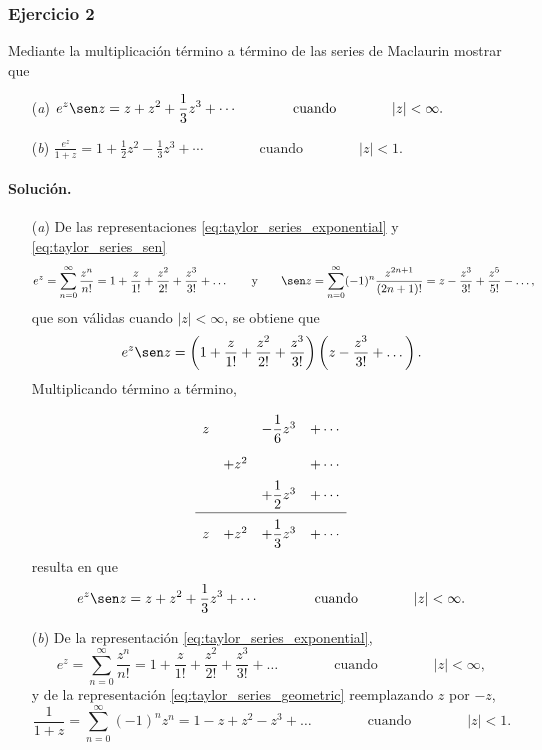 \documentclass[a4paper]{report}
\begin{document}
\subsubsection*{Ejercicio 2}

Mediante la multiplicación término a término de las series de Maclaurin mostrar que 
\begin{enumerate}
 \item[(\textit{a})] 
 \(
 \displaystyle e^z\sen z=z+z^2+\frac{1}{3}z^3+\cdots
 \qquad\qquad\textrm{cuando}\qquad\qquad
 |z|<\infty.
 \)
 \item[(\textit{b})] 
 \(
 \displaystyle\frac{e^z}{1+z}=1+\frac{1}{2}z^2-\frac{1}{3}z^3+\cdots
 \qquad\qquad\textrm{cuando}\qquad\qquad
 |z|<1.
 \) 
\end{enumerate}

\paragraph{Solución.} 
\begin{enumerate}
 \item[(\textit{a})] De las representaciones \ref{eq:taylor_series_exponential} y \ref{eq:taylor_series_sen}  
\[
 e^z=\sum_{n=0}^\infty\frac{z^n}{n!}=1+\frac{z}{1!}+\frac{z^2}{2!}+\frac{z^3}{3!}+\dots
 \qquad\textrm{y}\qquad 
 \sen z=\sum_{n=0}^\infty(-1)^n\frac{z^{2n+1}}{(2n+1)!}=z-\frac{z^3}{3!}+\frac{z^5}{5!}-\dots,
\]
que son válidas cuando \(|z|<\infty\), se obtiene que 
\[
 e^z\sen z=\left(1+\frac{z}{1!}+\frac{z^2}{2!}+\frac{z^3}{3!}\right)\left(z-\frac{z^3}{3!}+\dots\right).
\]
 Multiplicando término a término,
\[
\setlength\extrarowheight{10pt}
\begin{array}[t]{cccc}
 z &       & -\dfrac{1}{6}z^3 &+\cdots\\
   & +z^2  &                  &+\cdots\\
   &       &  +\dfrac{1}{2}z^3 &+\cdots\\[\medskipamount]   
\cline{1-4}
 z & +z^2  & +\dfrac{1}{3}z^3&+\cdots
\end{array}
\]
resulta en que 
\[
 e^z\sen z=z+z^2+\dfrac{1}{3}z^3+\cdots
 \qquad\qquad\textrm{cuando}\qquad\qquad
 |z|<\infty.
\]
 \item[(\textit{b})] De la representación \ref{eq:taylor_series_exponential},  
\[
 e^z=\sum_{n=0}^\infty\frac{z^n}{n!}=1+\frac{z}{1!}+\frac{z^2}{2!}+\frac{z^3}{3!}+\dots
 \qquad\qquad\textrm{cuando}\qquad\qquad
 |z|<\infty,
\]
y de la representación \ref{eq:taylor_series_geometric} reemplazando \(z\) por \(-z\),
\[
 \frac{1}{1+z}=\sum_{n=0}^\infty(-1)^nz^n=1-z+z^2-z^3+\dots
 \qquad\qquad\textrm{cuando}\qquad\qquad
 |z|<1.
\]
\end{enumerate} 
\end{document}
